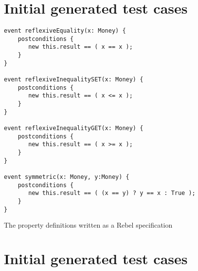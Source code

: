%



\appendix
\chapter{Initial generated test cases}
\label{app:a_event_definitions}
\begin{sourcecode}[h!]
\begin{lstlisting}[language=Rebel]
event reflexiveEquality(x: Money) {
    postconditions {
       new this.result == ( x == x );
    }
}

event reflexiveInequalitySET(x: Money) {
    postconditions {
       new this.result == ( x <= x );
    }
}

event reflexiveInequalityGET(x: Money) {
    postconditions {
       new this.result == ( x >= x );
    }
}

event symmetric(x: Money, y:Money) {
    postconditions {
       new this.result == ( (x == y) ? y == x : True );
    }
}
\end{lstlisting}
\caption{The property definitions written as a Rebel specification}
\end{sourcecode}

\chapter{Initial generated test cases}
\label{app:b_resulting_tests}

